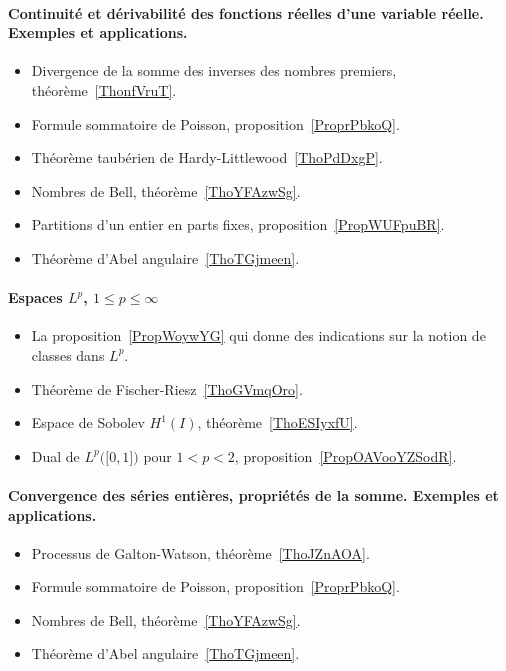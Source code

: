 \paragraph{Continuité et dérivabilité des fonctions réelles d'une variable réelle. Exemples et applications.}
\begin{itemize}
    \item Divergence de la somme des inverses des nombres premiers, théorème~\ref{ThonfVruT}.
    \item Formule sommatoire de Poisson, proposition~\ref{ProprPbkoQ}.
    \item Théorème taubérien de Hardy-Littlewood~\ref{ThoPdDxgP}.
    \item Nombres de Bell, théorème~\ref{ThoYFAzwSg}.
    \item Partitions d'un entier en parts fixes, proposition~\ref{PropWUFpuBR}.
    \item Théorème d'Abel angulaire~\ref{ThoTGjmeen}.
\end{itemize}
\paragraph{Espaces \( L^p\), \( 1\leq p\leq\infty\)}
\begin{itemize}
    \item La proposition~\ref{PropWoywYG} qui donne des indications sur la notion de classes dans \( L^p\).
    \item Théorème de Fischer-Riesz~\ref{ThoGVmqOro}.
    \item Espace de Sobolev \( H^1(I)\), théorème~\ref{ThoESIyxfU}.
    \item Dual de \( L^p\big( \mathopen[ 0 , 1 \mathclose] \big)\) pour \( 1<p<2\), proposition~\ref{PropOAVooYZSodR}.
\end{itemize}
\paragraph{Convergence des séries entières, propriétés de la somme. Exemples et applications.}
\begin{itemize}
    \item Processus de Galton-Watson, théorème~\ref{ThoJZnAOA}.
    \item Formule sommatoire de Poisson, proposition~\ref{ProprPbkoQ}.
    \item Nombres de Bell, théorème~\ref{ThoYFAzwSg}.
    \item Théorème d'Abel angulaire~\ref{ThoTGjmeen}.
\end{itemize}
